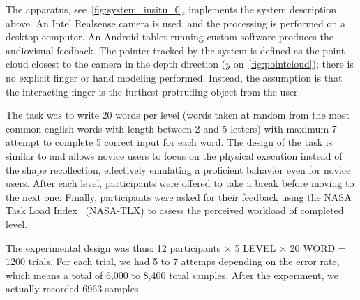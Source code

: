 \documentclass{chi-ext}
\newcommand{\cdt}[1]{{\small\uppercase{{#1}}}}
\begin{document}
The apparatus, see~\autoref{fig:system_insitu_0}, implements the system description above. An Intel Realsense camera is used, and the processing is performed on a desktop computer. An Android tablet running custom software produces the audiovisual feedback. The pointer tracked by the system is defined as the point cloud closest to the camera in the depth direction ($y$ on~\autoref{fig:pointcloud}); there is no explicit finger or hand modeling performed. Instead, the assumption is that the interacting finger is the furthest protruding object from the user.

The task was to write 20 words per level (words taken at random from the most common english words with length between 2 and 5 letters) with maximum 7 attempt to complete 5 correct input for each word. The design of the task is similar to \cite{Quinn2016} and allows novice users to focus on the physical execution instead of the shape recollection, effectively emulating a proficient bahavior even for novice users. After each level, participants were offered to take a break before moving to the next one. Finally, participants were asked for their feedback using the NASA Task Load Index~\cite{Hart1988} (NASA-TLX) to assess the perceived workload of completed level.

The experimental design was thus: 12 participants $\times$ 5 \cdt{level} $\times$ 20 \cdt{word} = 1200 trials. For each trial, we had 5 to 7 attemps depending on the error rate, which means a total of 6,000 to 8,400 total samples. After the experiment, we actually recorded 6963 samples.

\end{document}

